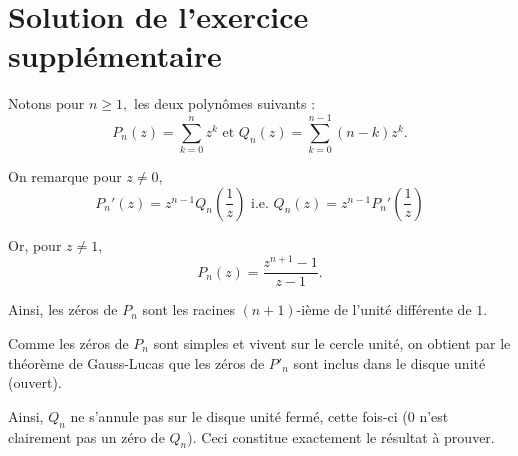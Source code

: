 \section{Solution de l'exercice supplémentaire} %

Notons pour $n\geq 1,$ les deux polynômes suivants : $$P_{n}(z)=\sum_{k=0}^{n}z^{k} \mbox{ et } Q_{n}(z)=\sum_{k=0}^{n-1}(n-k)z^{k}.$$

On remarque pour $z\neq 0,$ $$P_{n}'(z)=z^{n-1}Q_{n}(\frac{1}{z}) \mbox{ i.e. } Q_{n}(z)=z^{n-1}P_{n}'(\frac{1}{z}) $$

Or, pour $z\neq 1,$ $$P_{n}(z)=\frac{z^{n+1}-1}{z-1}.$$ 

Ainsi, les zéros de $P_{n}$ sont les racines $(n+1)$-ième de l'unité différente de $1.$

Comme les zéros de $P_{n}$ sont simples et vivent sur le cercle unité, on obtient par le théorème de Gauss-Lucas que les zéros de $P'_{n}$ sont inclus dans le disque unité (ouvert).

Ainsi, $Q_{n}$ ne s'annule pas sur le disque unité fermé, cette fois-ci ($0$ n'est clairement pas un zéro de $Q_{n}$). Ceci constitue exactement le résultat à prouver.
